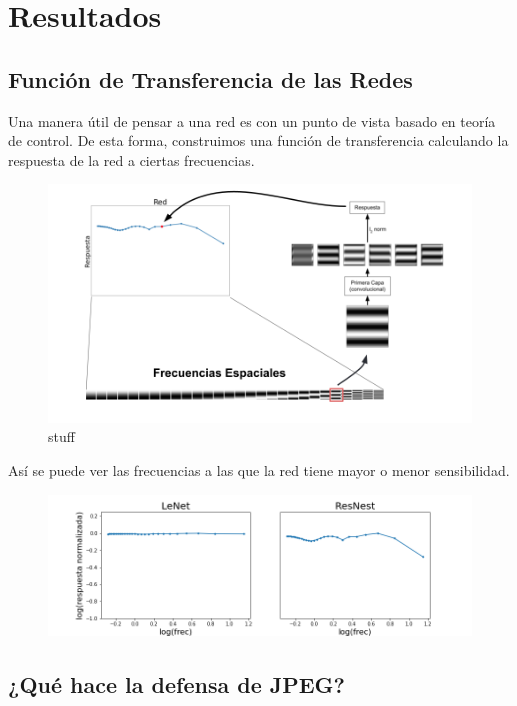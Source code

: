 \section{Resultados}
\subsection{Función de Transferencia de las Redes}
Una manera útil de pensar a una red es con un punto de vista basado en teoría de control. De esta forma, construimos una función de transferencia calculando la respuesta de la red a ciertas frecuencias. 
\begin{figure}[h!]
    \centering
    \includegraphics[width=\textwidth]{images/bode_diagrams/explanation_bode.png}
    \caption{stuff}
    \label{bode_explain}
\end{figure}

Así se puede ver las frecuencias a las que la red tiene mayor o menor sensibilidad.

\begin{figure}[h!]
    \centering
    \includegraphics[width=\textwidth]{images/bode_diagrams/mnist_nets.png}
    \caption{}
    \label{bode_examples}
\end{figure}



\subsection{¿Qué hace la defensa de JPEG?}

